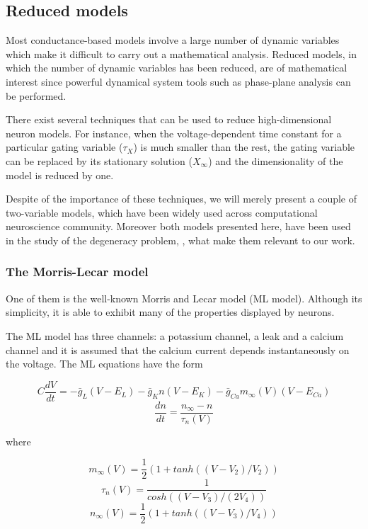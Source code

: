 \subsection{Reduced models}
Most conductance-based models involve a large number of dynamic variables which make it difficult to carry out a mathematical analysis. Reduced models, in which the number of dynamic variables has been reduced, are of mathematical interest since powerful dynamical system tools such as phase-plane analysis can be performed.

There exist several techniques that can be used to reduce high-dimensional neuron models. For instance, when the voltage-dependent time constant for a particular gating variable ($\tau_{X}$) is much smaller than the rest, the gating variable can be replaced by its stationary solution ($X_{\infty}$) and the dimensionality of the model is reduced by one.

Despite of the importance of these techniques, we will merely present a couple of two-variable models, which have been widely used across computational neuroscience community. Moreover both models presented here, have been used in the study of the degeneracy problem, \cite{Rot,Iii2019}, what make them relevant to our work.

\subsubsection{The Morris-Lecar model}
One of them is the well-known Morris and Lecar model (ML model). Although its simplicity, it is able to exhibit many of the properties displayed by neurons.

The ML model has three channels: a potassium channel, a leak and a calcium channel and it is assumed that the calcium current depends instantaneously on the voltage. The ML equations have the form

\begin{equation}
    C\frac{dV}{dt} = - \bar{g}_{L}(V-E_{L}) - \bar{g}_{K}n(V-E_{K}) - \bar{g}_{Ca}m_{\infty}(V)(V-E_{Ca})
\end{equation}
\begin{equation}
    \frac{dn}{dt} = \frac{n_{\infty}-n}{\tau_{n}(V)}
\end{equation}

where

\begin{equation}
    m_{\infty}(V) = \frac{1}{2}\left(1+tanh((V-V_{2})/V_{2}) \right)
\end{equation}
\begin{equation}
    \tau_{n}(V) = \frac{1}{cosh((V-V_{3})/(2V_{4}))}
\end{equation}
\begin{equation}
 n_{\infty}(V) = \frac{1}{2}\left(1+tanh((V-V_{3})/V_{4}) \right)
\end{equation}

